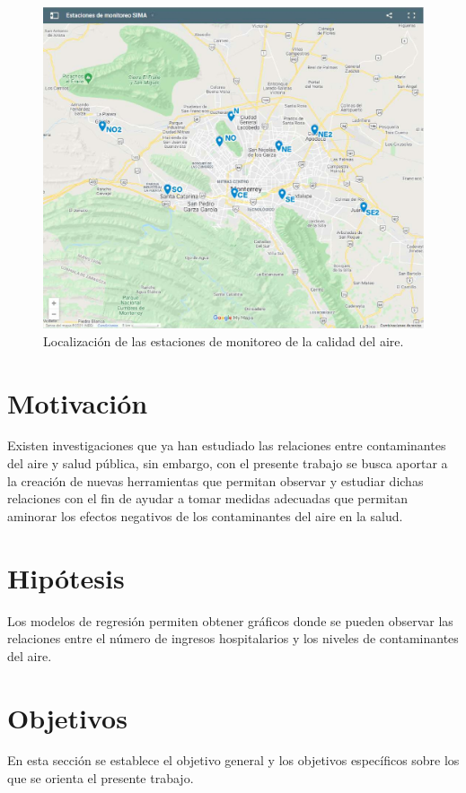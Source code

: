 \begin{figure}[h!]
\setcounter{figure}{0} %
\captionsetup{type=figure} %
\begin{center}
   \includegraphics[trim=50 50 50 50,clip,width=1\textwidth]{mapa_estaciones.eps}
   \end{center}
    \caption{Localización de las estaciones de monitoreo de la calidad del aire.}
    \label{estaciones}
\end{figure}

\clearpage
\section{Motivación}
Existen investigaciones que ya han estudiado las relaciones entre contaminantes del aire y salud pública, sin embargo, con el presente trabajo se busca aportar a la creación de nuevas herramientas que permitan observar y estudiar dichas relaciones con el fin de ayudar a tomar medidas adecuadas que permitan aminorar los efectos negativos de los contaminantes del aire en la salud.

\section{Hipótesis}
Los modelos de regresión permiten obtener gráficos donde se pueden observar las relaciones entre el número de ingresos hospitalarios y los niveles de contaminantes del aire.

\section{Objetivos}
En esta sección se establece el objetivo general y los objetivos específicos sobre los que se orienta el presente trabajo.

